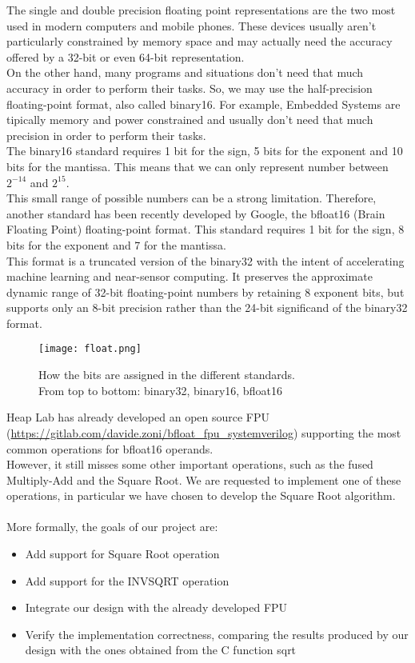 The single and double precision floating point representations are the two most used in modern computers and mobile phones. These devices usually aren’t particularly constrained by memory space and may actually need the accuracy offered by a 32-bit or even 64-bit representation.\\
On the other hand, many programs and situations don’t need that much accuracy in order to perform their tasks. So, we may use the half-precision floating-point format, also called binary16. For example, Embedded Systems are tipically memory and power constrained and usually don't need that much precision in order to perform their tasks. \\
The binary16 standard requires 1 bit for the sign, 5 bits for the exponent and 10 bits for the mantissa. This means that we can only represent number between $2^{-14}$ and $2^{15}$.\\
This small range of possible numbers can be a strong limitation. Therefore, another standard has been recently developed by Google, the bfloat16 (Brain Floating Point) floating-point format. This standard requires 1 bit for the sign, 8 bits for the exponent and 7 for the mantissa. \\
This format is a truncated version of the binary32 with the intent of accelerating machine learning and near-sensor computing. It preserves the approximate dynamic range of 32-bit floating-point numbers by retaining 8 exponent bits, but supports only an 8-bit precision rather than the 24-bit significand of the binary32 format. 

\begin{figure}[h]
	\centering
	\captionsetup{justification=centering}
	\texttt{[image: float.png]}	
	\caption{How the bits are assigned in the different standards. \\From top to bottom: binary32, binary16, bfloat16}
\end{figure}

Heap Lab has already developed an open source FPU (\url{https://gitlab.com/davide.zoni/bfloat_fpu_systemverilog}) supporting the most common operations for bfloat16 operands. \\
However, it still misses some other important operations, such as the fused Multiply-Add and the Square Root. We are requested to implement one of these operations, in particular we have chosen to develop the Square Root algorithm.\\
\\
More formally, the goals of our project are:
\begin{itemize}
	\item Add support for Square Root operation
	\item Add support for the INVSQRT operation
	\item Integrate our design with the already developed FPU
	\item Verify the implementation correctness, comparing the results produced by our design with the ones obtained from the C function sqrt
\end{itemize}


